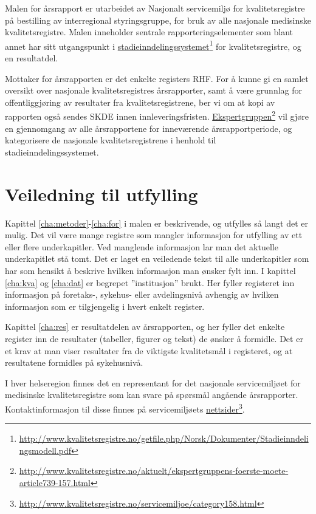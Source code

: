 \documentclass[norsk, a4paper, twocolumn]{report}
\begin{document}
Malen for årsrapport er utarbeidet av Nasjonalt servicemiljø for
kvalitetsregistre på bestilling av interregional styringsgruppe, for bruk av alle
nasjonale medisinske kvalitetsregistre. Malen inneholder sentrale
rapporteringselementer som blant annet har sitt utgangspunkt i
\href{http://www.kvalitetsregistre.no/getfile.php/Norsk/Dokumenter/Stadieinndelingsmodell.pdf}{stadieinndelingssystemet}\footnote{\url{http://www.kvalitetsregistre.no/getfile.php/Norsk/Dokumenter/Stadieinndelingsmodell.pdf}}
for kvalitetsregistre, og en resultatdel.

Mottaker for årsrapporten er det enkelte registers RHF. For å kunne gi en
samlet oversikt over nasjonale kvalitetsregistres
årsrapporter, samt å være grunnlag for offentliggjøring av resultater fra
kvalitetsregistrene, ber vi om at kopi av rapporten også sendes SKDE innen
innleveringsfristen.
\href{http://www.kvalitetsregistre.no/aktuelt/ekspertgruppens-foerste-moete-article739-157.html}{Ekspertgruppen}\footnote{\url{http://www.kvalitetsregistre.no/aktuelt/ekspertgruppens-foerste-moete-article739-157.html}}
vil gjøre en gjennomgang av alle årsrapportene for inneværende
årsrapportperiode, og kategorisere de nasjonale kvalitetsregistrene i henhold
til stadieinndelingssystemet.


\section*{Veiledning til utfylling}
Kapittel \ref{cha:metoder}-\ref{cha:for} i malen er beskrivende, og utfylles så
langt det er mulig. Det vil
være mange registre som mangler informasjon for utfylling av ett eller flere
underkapitler. Ved manglende informasjon lar man det aktuelle underkapitlet
stå tomt. Det er laget en veiledende tekst til alle underkapitler som har
som hensikt å beskrive hvilken informasjon man ønsker fylt inn. I kapittel
\ref{cha:kva} og \ref{cha:dat}
er begrepet ”institusjon” brukt. Her fyller registeret inn informasjon på
foretaks-, sykehus- eller avdelingsnivå avhengig av hvilken informasjon som er
tilgjengelig i hvert enkelt register. 

Kapittel \ref{cha:res} er resultatdelen av årsrapporten, og her fyller det
enkelte
register inn de resultater (tabeller, figurer og tekst) de ønsker å formidle.
Det er et krav at man viser resultater fra de viktigste kvalitetsmål i
registeret, og at resultatene formidles på sykehusnivå.

I hver helseregion finnes det en representant for det nasjonale servicemiljøet
for medisinske kvalitetsregistre som kan svare på spørsmål angående
årsrapporter. Kontaktinformasjon til disse finnes på
servicemiljøets \href{http://www.kvalitetsregistre.no/servicemiljoe/category158.html}{nettsider}\footnote{\url{http://www.kvalitetsregistre.no/servicemiljoe/category158.html}}.
\end{document}

